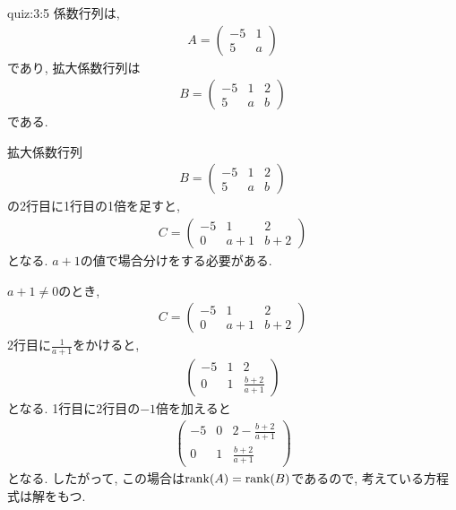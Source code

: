  

\begin{answerof}{quiz:3:5}
  係数行列は,
  \begin{align*}
    A=\begin{pmatrix}-5&1\\5&a\end{pmatrix}
  \end{align*}
  であり,
  拡大係数行列は
  \begin{align*}
    B=\begin{pmatrix}-5&1&2\\5&a&b\end{pmatrix}
  \end{align*}
  である.

  拡大係数行列
  \begin{align*}
    B=\begin{pmatrix}-5&1&2\\5&a&b\end{pmatrix}
  \end{align*}
  の2行目に1行目の1倍を足すと,
  \begin{align*}
    C=\begin{pmatrix}-5&1&2\\0&a+1&b+2\end{pmatrix}
  \end{align*}
  となる.
  $a+1$の値で場合分けをする必要がある.

  $a+1\neq 0$のとき,
  \begin{align*}
    C=\begin{pmatrix}-5&1&2\\0&a+1&b+2\end{pmatrix}
  \end{align*}
  2行目に$\frac{1}{a+1}$をかけると,
  \begin{align*}
    \begin{pmatrix}-5&1&2\\0&1&\frac{b+2}{a+1}\end{pmatrix}
  \end{align*}
  となる.
  1行目に2行目の$-1$倍を加えると
  \begin{align*}
    \begin{pmatrix}-5&0&2-\frac{b+2}{a+1}\\0&1&\frac{b+2}{a+1}\end{pmatrix}
  \end{align*}
  となる.
  したがって, この場合は$\operatorname{rank}(A)=\operatorname{rank}(B)$であるので,
  考えている方程式は解をもつ.



\end{answerof}
